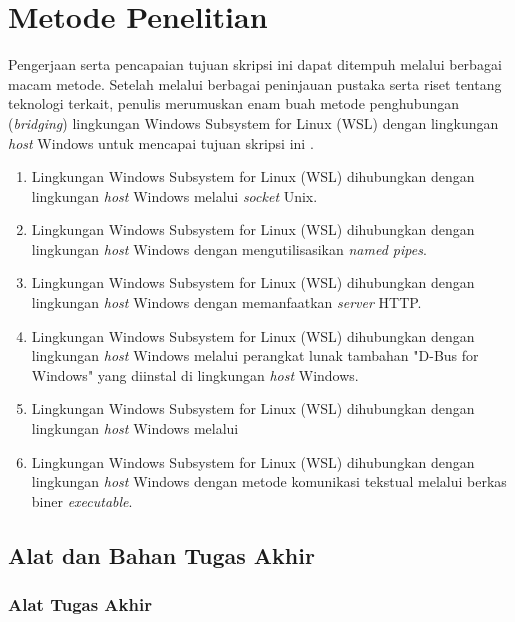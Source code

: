 \chapter{Metode Penelitian}

Pengerjaan serta pencapaian tujuan skripsi ini dapat ditempuh melalui berbagai macam metode. Setelah melalui berbagai peninjauan pustaka serta riset tentang teknologi terkait, penulis merumuskan enam buah metode penghubungan (\textit{bridging}) lingkungan Windows Subsystem for Linux (WSL) dengan lingkungan \textit{host} Windows untuk mencapai tujuan skripsi ini .
\begin{enumerate}
    \item Lingkungan Windows Subsystem for Linux (WSL) dihubungkan dengan lingkungan \textit{host} Windows melalui \textit{socket} Unix.
    \item Lingkungan Windows Subsystem for Linux (WSL) dihubungkan dengan lingkungan \textit{host} Windows dengan mengutilisasikan \textit{named pipes}.
    \item Lingkungan Windows Subsystem for Linux (WSL) dihubungkan dengan lingkungan \textit{host} Windows dengan memanfaatkan \textit{server} HTTP.
    \item Lingkungan Windows Subsystem for Linux (WSL) dihubungkan dengan lingkungan \textit{host} Windows melalui perangkat lunak tambahan "D-Bus for Windows" yang diinstal di lingkungan \textit{host} Windows.
    \item Lingkungan Windows Subsystem for Linux (WSL) dihubungkan dengan lingkungan \textit{host} Windows melalui 
    \item Lingkungan Windows Subsystem for Linux (WSL) dihubungkan dengan lingkungan \textit{host} Windows dengan metode komunikasi tekstual melalui berkas biner \textit{executable}.
\end{enumerate}

\section{Alat dan Bahan Tugas Akhir}

\subsection{Alat Tugas Akhir}

